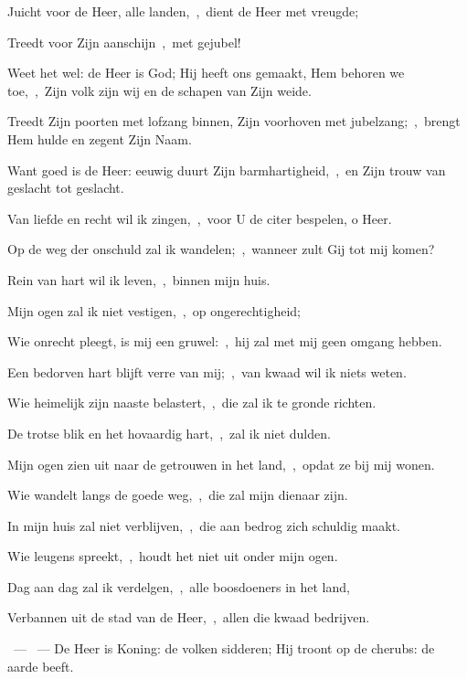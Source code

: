 \documentclass[12pt,twoside,a5paper]{article}
\begin{document}
\begin{halfparskip}
   Juicht voor de Heer, alle landen,~\sep\ dient de Heer met vreugde;

  Treedt voor Zijn aanschijn~\sep\ met gejubel!

  Weet het wel: de Heer is God; Hij heeft ons gemaakt, Hem behoren we toe,~\sep\ Zijn volk zijn wij en de schapen van Zijn weide.

  Treedt Zijn poorten met lofzang binnen, Zijn voorhoven met jubelzang;~\sep\ brengt Hem hulde en zegent Zijn Naam.

  Want goed is de Heer: eeuwig duurt Zijn barmhartigheid,~\sep\ en Zijn trouw van geslacht tot geslacht.
\end{halfparskip}

\begin{halfparskip}
   Van liefde en recht wil ik zingen,~\sep\ voor U de citer bespelen, o Heer.

  Op de weg der onschuld zal ik wandelen;~\sep\ wanneer zult Gij tot mij komen?

  Rein van hart wil ik leven,~\sep\ binnen mijn huis.

  Mijn ogen zal ik niet vestigen,~\sep\ op ongerechtigheid;

  Wie onrecht pleegt, is mij een gruwel:~\sep\ hij zal met mij geen omgang hebben.

  Een bedorven hart blijft verre van mij;~\sep\ van kwaad wil ik niets weten.

  Wie heimelijk zijn naaste belastert,~\sep\ die zal ik te gronde richten.

  De trotse blik en het hovaardig hart,~\sep\ zal ik niet dulden.

  Mijn ogen zien uit naar de getrouwen in het land,~\sep\ opdat ze bij mij wonen.

  Wie wandelt langs de goede weg,~\sep\ die zal mijn dienaar zijn.

  In mijn huis zal niet verblijven,~\sep\ die aan bedrog zich schuldig maakt.

  Wie leugens spreekt,~\sep\ houdt het niet uit onder mijn ogen.

  Dag aan dag zal ik verdelgen,~\sep\ alle boosdoeners in het land,

  Verbannen uit de stad van de Heer,~\sep\ allen die kwaad bedrijven.
\end{halfparskip}

\begin{halfparskip}
  ~--- ~---  De Heer is Koning: de volken sidderen; Hij troont op de cherubs: de aarde beeft.
\end{halfparskip}
\end{document}
